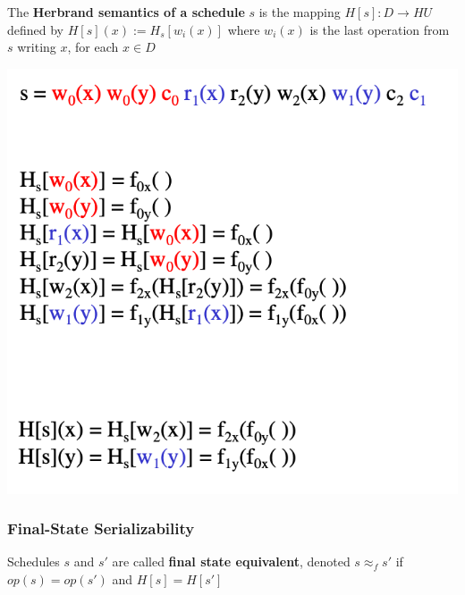 \documentclass[11pt]{article}
\begin{document}
\begin{definition}
The \textbf{Herbrand semantics of a schedule} \(s\) is the mapping \(H[s]:D\to HU\) defined
by \(H[s](x):=H_s[w_i(x)]\) where \(w_i(x)\) is the last operation from \(s\) writing \(x\), for
each \(x\in D\)
\end{definition}

\begin{center}
\includegraphics[width=.6\textwidth]{../images/bigdatabase/7.png}
\label{}
\end{center}
\subsubsection{Final-State Serializability}
\label{sec:org4790b6a}
\begin{definition}[]
Schedules \(s\) and \(s'\) are called \textbf{final state equivalent}, denoted \(s\approx_fs'\)
if \(op(s)=op(s')\) and \(H[s]=H[s']\)
\end{definition}
\end{document}
